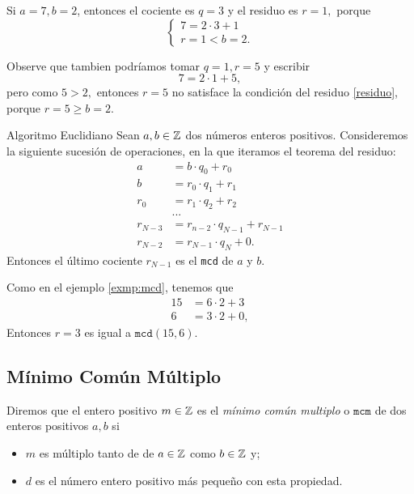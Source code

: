 	\begin{problema}
		Si $a=7,b=2$, entonces el cociente es $q=3$ y el residuo es $r=1,$ porque
		$$\begin{cases}
			7=2\cdot 3+1\\ {r=1}<{b=2}.     
		\end{cases}
		$$
	\end{problema}

		Observe que tambien podr\'iamos tomar $q=1, r=5$ y escribir $$7=2\cdot 1+5,$$ pero como ${5}>{2},$ entonces $r=5$ no 
		satisface la condici\'on del residuo \eqref{residuo}, porque ${r=5}\geq {b=2}.$

	\begin{algoritmo}{Algoritmo Euclidiano}
		Sean $a,b\in \mathbb{Z}$ dos números enteros positivos. Consideremos la siguiente sucesi\'on de operaciones, en la que iteramos el teorema del residuo:
		\begin{align*}
			a&=b\cdot q_{0}+r_{0} \\
			b&=r_{0}\cdot q_{1}+r_{1}\\
			r_{0}&=r_{1}\cdot q_{2}+r_{2}\\
			&...\\
			r_{N-3}&=r_{n-2}\cdot q_{N-1}+r_{N-1}\\
			r_{N-2}&=r_{N-1}\cdot q_{N}+0.
		\end{align*}
		Entonces el último cociente $r_{N-1}$ es el \texttt{mcd} de $a$ y $b.$
	\end{algoritmo}
	
	
	Como en el ejemplo \ref{exmp:mcd}, tenemos que 
	\begin{align*}
		15&=6\cdot 2+3\\ 
		6&=3\cdot 2+0, 
	\end{align*}
	Entonces $r=3$ es igual a $\texttt{mcd}(15,6)$.



\subsection{M\'inimo Común Múltiplo}


	\begin{definicion}
		\label{mcm} 
		Diremos que el entero positivo $m\in \mathbb{Z}$ es el \emph{m\'inimo común multiplo} o $\texttt{mcm}$ de dos enteros positivos $a,b$ si
		\begin{itemize}
			\item $m$ es múltiplo tanto de de $a\in \mathbb{Z}$ como $b\in \mathbb{Z}$ y;
			\item $d$ es el número entero positivo más pequeño con esta propiedad.
		\end{itemize}		
	\end{definicion}
	
